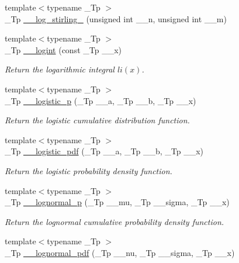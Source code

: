 \begin{DoxyCompactItemize}
\item 
{\footnotesize template$<$typename \+\_\+\+Tp $>$ }\\\+\_\+\+Tp \hyperlink{namespacestd_1_1____detail_a7ba1fde0547236676d579b6405f2fb25}{\+\_\+\+\_\+log\+\_\+stirling\+\_} (unsigned int \+\_\+\+\_\+n, unsigned int \+\_\+\+\_\+m)
\item 
{\footnotesize template$<$typename \+\_\+\+Tp $>$ }\\\+\_\+\+Tp \hyperlink{namespacestd_1_1____detail_a4d5f8cb2b4e6e192faba9418ec14149f}{\+\_\+\+\_\+logint} (const \+\_\+\+Tp \+\_\+\+\_\+x)
\begin{DoxyCompactList}\small\item\em Return the logarithmic integral $ li(x) $. \end{DoxyCompactList}\item 
{\footnotesize template$<$typename \+\_\+\+Tp $>$ }\\\+\_\+\+Tp \hyperlink{namespacestd_1_1____detail_a2ee185d74e39b87c74c3c428f8e73ee7}{\+\_\+\+\_\+logistic\+\_\+p} (\+\_\+\+Tp \+\_\+\+\_\+a, \+\_\+\+Tp \+\_\+\+\_\+b, \+\_\+\+Tp \+\_\+\+\_\+x)
\begin{DoxyCompactList}\small\item\em Return the logistic cumulative distribution function. \end{DoxyCompactList}\item 
{\footnotesize template$<$typename \+\_\+\+Tp $>$ }\\\+\_\+\+Tp \hyperlink{namespacestd_1_1____detail_a4c845b9f17fc3e35dccc0954d82d62f9}{\+\_\+\+\_\+logistic\+\_\+pdf} (\+\_\+\+Tp \+\_\+\+\_\+a, \+\_\+\+Tp \+\_\+\+\_\+b, \+\_\+\+Tp \+\_\+\+\_\+x)
\begin{DoxyCompactList}\small\item\em Return the logistic probability density function. \end{DoxyCompactList}\item 
{\footnotesize template$<$typename \+\_\+\+Tp $>$ }\\\+\_\+\+Tp \hyperlink{namespacestd_1_1____detail_a332aebbc96ef310620918cb6becb9760}{\+\_\+\+\_\+lognormal\+\_\+p} (\+\_\+\+Tp \+\_\+\+\_\+mu, \+\_\+\+Tp \+\_\+\+\_\+sigma, \+\_\+\+Tp \+\_\+\+\_\+x)
\begin{DoxyCompactList}\small\item\em Return the lognormal cumulative probability density function. \end{DoxyCompactList}\item 
{\footnotesize template$<$typename \+\_\+\+Tp $>$ }\\\+\_\+\+Tp \hyperlink{namespacestd_1_1____detail_a46c5dea7a38f38965bce5a84d389a02b}{\+\_\+\+\_\+lognormal\+\_\+pdf} (\+\_\+\+Tp \+\_\+\+\_\+nu, \+\_\+\+Tp \+\_\+\+\_\+sigma, \+\_\+\+Tp \+\_\+\+\_\+x)

\end{DoxyCompactItemize}
